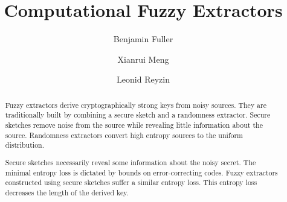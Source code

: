 \documentclass[11pt]{article}
\title{\textbf{Computational Fuzzy Extractors}}
\author{Benjamin Fuller%
 \and Xianrui Meng \and Leonid Reyzin}
\newcommand{\authnote}[2]{{\textcolor{red}{\textsf{#1 notes: }\textcolor{blue}{ #2}}\marginpar{\textcolor{red}{\textbf{!!!!!}}}}}
\newcommand{\authnote}[2]{}
\newcommand{\lnote}[1]{{\authnote{Leo}{#1}}}
\begin{document}
\maketitle

\begin{abstract} 
Fuzzy extractors derive cryptographically strong keys from noisy sources.  They are traditionally built by combining a secure sketch and a randomness extractor.  Secure sketches remove noise from the source while revealing little information about the source.  Randomness extractors convert high entropy sources to the uniform distribution.  %

Secure sketches necessarily reveal some information about the noisy secret.
The minimal entropy loss is dictated by bounds on error-correcting codes.  
Fuzzy extractors constructed using secure sketches suffer a similar entropy loss.  This entropy loss decreases the length of the derived key.  


\end{abstract}
\end{document}
